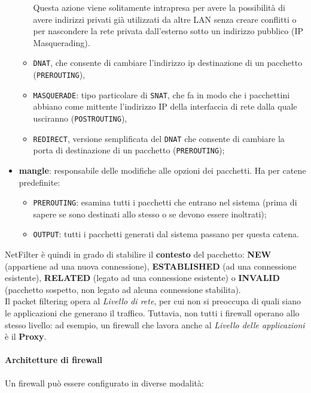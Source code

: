\documentclass[a4paper,11pt]{article}
\def\code#1{\texttt{#1}}
\def\para#1{\paragraph{#1}\label{#1}}
\begin{document}
\begin{itemize}
\begin{itemize}
Questa azione viene solitamente intrapresa per avere la possibilità di avere indirizzi privati già utilizzati da altre LAN senza creare conflitti o per nascondere la rete privata dall'esterno sotto un indirizzo pubblico (IP 
Masquerading).
\item \code{DNAT}, che consente di cambiare l’indirizzo ip destinazione di un pacchetto (\code{PREROUTING}),
\item \code{MASQUERADE}: tipo particolare di \code{SNAT}, che fa in modo che i pacchettini abbiano come mittente l’indirizzo IP della interfaccia di rete dalla quale usciranno (\code{POSTROUTING}),
\item \code{REDIRECT}, versione semplificata del \code{DNAT} che consente di cambiare la porta di destinazione di un pacchetto (\code{PREROUTING});
\end{itemize}
\item \textbf{mangle}: responsabile delle modifiche alle opzioni dei pacchetti. Ha per catene predefinite:
\begin{itemize}
\item \code{PREROUTING}: esamina tutti i pacchetti che entrano nel sistema (prima di sapere se sono destinati allo stesso o se devono essere inoltrati);
\item \code{OUTPUT}: tutti i pacchetti generati dal sistema passano per questa catena.
\end{itemize}
\end{itemize}
NetFilter è quindi in grado di stabilire il \textbf{contesto} del pacchetto: \textbf{NEW} (appartiene ad una nuova connessione), \textbf{ESTABLISHED} (ad una connessione esistente), \textbf{RELATED} (legato ad una connessione esistente) o \textbf{INVALID} (pacchetto sospetto, non legato ad alcuna connessione stabilita).\\
Il packet filtering opera al \textit{Livello di rete}, per cui non si preoccupa di quali siano le applicazioni che generano il traffico. Tuttavia, non tutti i firewall operano allo stesso livello: ad esempio, un firewall che lavora anche al \textit{Livello delle applicazioni} è il \textbf{Proxy}.
\para{Architetture di firewall} 
Un firewall può essere configurato in diverse modalità:
\end{document}
